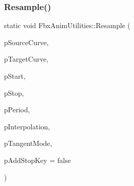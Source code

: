 \mbox{\label{class_fbx_anim_utilities_ad9fce04e63f88c748c00a9451b4b099b}} 
\subsubsection{\texorpdfstring{Resample()}{Resample()}\hspace{0.1cm}{\footnotesize\ttfamily [1/3]}}
{\footnotesize\ttfamily static void Fbx\+Anim\+Utilities\+::\+Resample (\begin{DoxyParamCaption}\item[{\hyperlink{class_fbx_anim_curve}{Fbx\+Anim\+Curve} \&}]{p\+Source\+Curve,  }\item[{\hyperlink{class_fbx_anim_curve}{Fbx\+Anim\+Curve} \&}]{p\+Target\+Curve,  }\item[{\hyperlink{class_fbx_time}{Fbx\+Time} \&}]{p\+Start,  }\item[{\hyperlink{class_fbx_time}{Fbx\+Time} \&}]{p\+Stop,  }\item[{\hyperlink{class_fbx_time}{Fbx\+Time} \&}]{p\+Period,  }\item[{\hyperlink{class_fbx_anim_curve_def_add2ab7d10d856ab0868cc9b143d59ea5}{Fbx\+Anim\+Curve\+Def\+::\+E\+Interpolation\+Type}}]{p\+Interpolation,  }\item[{\hyperlink{class_fbx_anim_curve_def_ac810ccc5ca0527704ab5175479964b87}{Fbx\+Anim\+Curve\+Def\+::\+E\+Tangent\+Mode}}]{p\+Tangent\+Mode,  }\item[{bool}]{p\+Add\+Stop\+Key = {\ttfamily false} }\end{DoxyParamCaption})\hspace{0.3cm}{\ttfamily [static]}}

\mbox{\label{class_fbx_anim_utilities_a7ca36067a237e86124878d2000ddd9e5}} 
